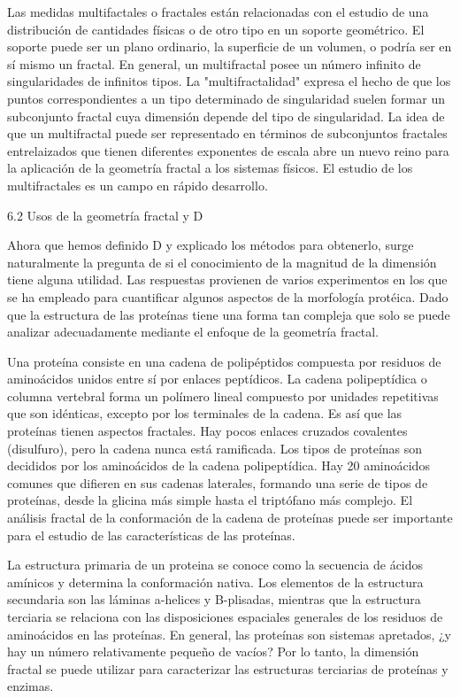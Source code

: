 \documentclass[11pt]{article}
\begin{document}
Las medidas multifactales o fractales están relacionadas con el estudio de una distribución de cantidades físicas o de otro tipo en un soporte geométrico. El soporte puede ser un plano ordinario, la superficie de un volumen, o podría ser en sí mismo un fractal. En general, un multifractal posee un número infinito de singularidades de infinitos tipos. La "multifractalidad" expresa el hecho de que los puntos correspondientes a un tipo determinado de singularidad suelen formar un subconjunto fractal cuya dimensión depende del tipo de singularidad. La idea de que un multifractal puede ser representado en términos de subconjuntos fractales entrelaizados que tienen diferentes exponentes de escala abre un nuevo reino para la aplicación de la geometría fractal a los sistemas físicos. El estudio de los multifractales es un campo en rápido desarrollo.


6.2 Usos de la geometría fractal y D

Ahora que hemos definido D y explicado los métodos para obtenerlo, surge naturalmente la pregunta de si el conocimiento de la magnitud de la dimensión tiene alguna utilidad. Las respuestas provienen de varios experimentos en los que se ha empleado para cuantificar algunos aspectos de la morfología protéica. Dado que la estructura de las proteínas tiene una forma tan compleja que solo se puede analizar adecuadamente mediante el enfoque de la geometría fractal. 

Una proteína consiste en una cadena de polipéptidos compuesta por residuos de aminoácidos unidos entre sí por enlaces peptídicos. La cadena polipeptídica o columna vertebral forma un polímero lineal compuesto por unidades repetitivas que son idénticas, excepto por los terminales de la cadena. Es así que las proteínas tienen aspectos fractales. Hay pocos enlaces cruzados covalentes (disulfuro), pero la cadena nunca está ramificada. Los tipos de proteínas son decididos por los aminoácidos de la cadena polipeptídica. Hay 20 aminoácidos comunes que difieren en sus cadenas laterales, formando una serie de tipos de proteínas, desde la glicina más simple hasta el triptófano más complejo. El análisis fractal de la conformación de la cadena de proteínas puede ser importante para el estudio de las características de las proteínas.

La estructura primaria de un proteina se conoce como la secuencia de ácidos amínicos y determina la conformación nativa. Los elementos de la estructura secundaria son las láminas a-helices y B-plisadas, mientras que la estructura terciaria se relaciona con las disposiciones espaciales generales de los residuos de aminoácidos en las proteínas. En general, las proteínas son sistemas apretados, ¿y hay un número relativamente pequeño de vacíos? Por lo tanto, la dimensión fractal se puede utilizar para caracterizar las estructuras terciarias de proteínas y enzimas.
\end{document}
